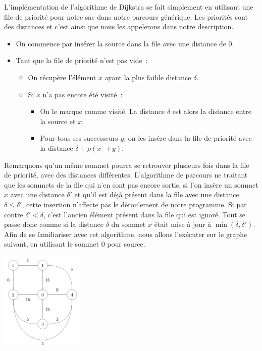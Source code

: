 \documentclass{magnolia}
\begin{document}
L'implémentation de l'algorithme de Dijkstra se fait simplement en utilisant
une file de priorité pour notre sac dans notre parcours générique. Les priorités
sont des distances et c'est ainsi que nous les appelerons dans notre description.
\begin{itemize}
\item On commence par insérer la source dans la file avec une distance de $0$.
\item Tant que la file de priorité n'est pas vide~:
\begin{itemize}
\item On récupère l'élément $x$ ayant la plus faible distance $\delta$.
\item Si $x$ n'a pas encore été visité~:
  \begin{itemize}
  \item On le marque comme visité. La distance $\delta$ est alors la distance entre la source
    et $x$.
  \item Pour tous ses successeurs $y$, on les insère dans la file de priorité avec
    la distance $\delta+\rho(x\to y)$.
  \end{itemize}
\end{itemize}
\end{itemize}

\vspace{2ex}
Remarquons qu'un même sommet pourra se retrouver plusieurs fois dans la file de
priorité, avec des distances différentes. L'algorithme de parcours ne traitant que les
sommets de la file qui n'en sont pas encore sortis, si l'on insère un sommet $x$ 
avec une distance $\delta'$ et qu'il est déjà présent dans la file avec une distance $\delta\leq \delta'$, cette
insertion n'affecte pas le déroulement de notre programme. Si par contre $\delta'<\delta$, c'est
l'ancien élément présent dans la file qui est ignoré. Tout se passe
donc comme si la distance $\delta$ du sommet $x$ était mise à jour à $\min(\delta,\delta')$.\\

Afin de se familiariser avec cet algorithme, nous allons l'exécuter
sur le graphe suivant, en utilisant le sommet 0 pour source.

\begin{center}
\includegraphics[width=0.3\textwidth]{../../Commun/Images/python-cours-graphe-dikstra.png}
\end{center}
\end{document}

